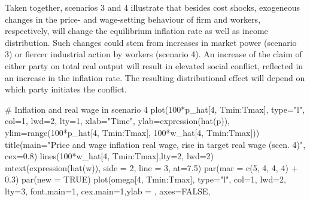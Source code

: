 \documentclass[
  letterpaper,
  DIV=11,
  numbers=noendperiod]{scrreprt}
\newenvironment{Shaded}{\begin{snugshade}}{\end{snugshade}}
\newcommand{\AttributeTok}[1]{\textcolor[rgb]{0.40,0.45,0.13}{#1}}
\newcommand{\CommentTok}[1]{\textcolor[rgb]{0.37,0.37,0.37}{#1}}
\newcommand{\ConstantTok}[1]{\textcolor[rgb]{0.56,0.35,0.01}{#1}}
\newcommand{\DecValTok}[1]{\textcolor[rgb]{0.68,0.00,0.00}{#1}}
\newcommand{\FloatTok}[1]{\textcolor[rgb]{0.68,0.00,0.00}{#1}}
\newcommand{\FunctionTok}[1]{\textcolor[rgb]{0.28,0.35,0.67}{#1}}
\newcommand{\NormalTok}[1]{\textcolor[rgb]{0.00,0.23,0.31}{#1}}
\newcommand{\SpecialCharTok}[1]{\textcolor[rgb]{0.37,0.37,0.37}{#1}}
\newcommand{\StringTok}[1]{\textcolor[rgb]{0.13,0.47,0.30}{#1}}
\begin{document}
Taken together, scenarios 3 and 4 illustrate that besides cost shocks,
exogeneous changes in the price- and wage-setting behaviour of firm and
workers, respectively, will change the equilibrium inflation rate as
well as income distribution. Such changes could stem from increases in
market power (scenario 3) or fiercer industrial action by workers
(scenario 4). An increase of the claim of either party on total real
output will result in elevated social conflict, reflected in an increase
in the inflation rate. The resulting distributional effect will depend
on which party initiates the conflict.

\begin{Shaded}
\begin{Highlighting}[]
\CommentTok{\# Inflation and real wage in scenario 4}
\FunctionTok{plot}\NormalTok{(}\DecValTok{100}\SpecialCharTok{*}\NormalTok{p\_hat[}\DecValTok{4}\NormalTok{, Tmin}\SpecialCharTok{:}\NormalTok{Tmax], }\AttributeTok{type=}\StringTok{"l"}\NormalTok{, }\AttributeTok{col=}\DecValTok{1}\NormalTok{, }\AttributeTok{lwd=}\DecValTok{2}\NormalTok{, }\AttributeTok{lty=}\DecValTok{1}\NormalTok{, }\AttributeTok{xlab=}\StringTok{"Time"}\NormalTok{, }\AttributeTok{ylab=}\FunctionTok{expression}\NormalTok{(}\FunctionTok{hat}\NormalTok{(p)), }\AttributeTok{ylim=}\FunctionTok{range}\NormalTok{(}\DecValTok{100}\SpecialCharTok{*}\NormalTok{p\_hat[}\DecValTok{4}\NormalTok{, Tmin}\SpecialCharTok{:}\NormalTok{Tmax], }\DecValTok{100}\SpecialCharTok{*}\NormalTok{w\_hat[}\DecValTok{4}\NormalTok{, Tmin}\SpecialCharTok{:}\NormalTok{Tmax])) }
\FunctionTok{title}\NormalTok{(}\AttributeTok{main=}\StringTok{"Price and wage inflation real wage, rise in target real wage (scen. 4)"}\NormalTok{, }\AttributeTok{cex=}\FloatTok{0.8}\NormalTok{)}
\FunctionTok{lines}\NormalTok{(}\DecValTok{100}\SpecialCharTok{*}\NormalTok{w\_hat[}\DecValTok{4}\NormalTok{, Tmin}\SpecialCharTok{:}\NormalTok{Tmax],}\AttributeTok{lty=}\DecValTok{2}\NormalTok{, }\AttributeTok{lwd=}\DecValTok{2}\NormalTok{)}
\FunctionTok{mtext}\NormalTok{(}\FunctionTok{expression}\NormalTok{(}\FunctionTok{hat}\NormalTok{(w)), }\AttributeTok{side =} \DecValTok{2}\NormalTok{, }\AttributeTok{line =} \DecValTok{3}\NormalTok{, }\AttributeTok{at=}\FloatTok{7.5}\NormalTok{)}
\FunctionTok{par}\NormalTok{(}\AttributeTok{mar =} \FunctionTok{c}\NormalTok{(}\DecValTok{5}\NormalTok{, }\DecValTok{4}\NormalTok{, }\DecValTok{4}\NormalTok{, }\DecValTok{4}\NormalTok{) }\SpecialCharTok{+} \FloatTok{0.3}\NormalTok{)}
\FunctionTok{par}\NormalTok{(}\AttributeTok{new =} \ConstantTok{TRUE}\NormalTok{)}
\FunctionTok{plot}\NormalTok{(omega[}\DecValTok{4}\NormalTok{, Tmin}\SpecialCharTok{:}\NormalTok{Tmax], }\AttributeTok{type=}\StringTok{"l"}\NormalTok{, }\AttributeTok{col=}\DecValTok{1}\NormalTok{, }\AttributeTok{lwd=}\DecValTok{2}\NormalTok{, }\AttributeTok{lty=}\DecValTok{3}\NormalTok{, }\AttributeTok{font.main=}\DecValTok{1}\NormalTok{, }\AttributeTok{cex.main=}\DecValTok{1}\NormalTok{,}\AttributeTok{ylab =} \StringTok{\textquotesingle{}\textquotesingle{}}\NormalTok{, }\AttributeTok{axes=}\ConstantTok{FALSE}\NormalTok{,}

\end{Highlighting}
\end{Shaded}
\end{document}
